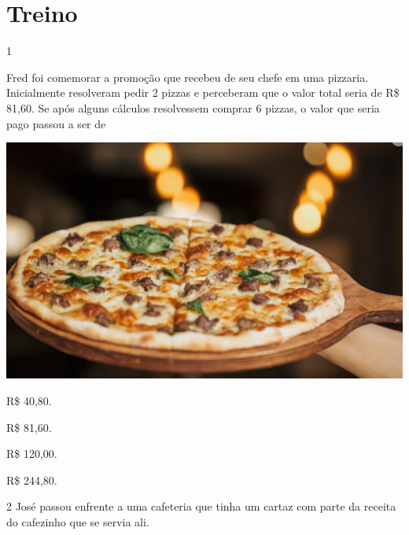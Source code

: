\pagebreak
\section*{Treino}

\num{1}

\begin{minipage}{.5\textwidth}
Fred foi comemorar a promoção que recebeu de seu chefe em uma
pizzaria. Inicialmente resolveram pedir 2 pizzas e perceberam que o
valor total seria de R\$ 81,60. Se após alguns cálculos resolvessem
comprar 6 pizzas, o valor que seria pago passou a ser de 
\end{minipage}\hspace{.5cm}
\begin{minipage}{.5\textwidth}
\includegraphics[width=\textwidth]{./imgs/mat15.png}
\end{minipage}

\begin{minipage}{.5\textwidth}
\begin{escolha}
\item
  R\$ 40,80.
\item
  R\$ 81,60.
\item
  R\$ 120,00.
\item
  R\$ 244,80.
\end{escolha}
\end{minipage}



\num{2} José passou enfrente a uma cafeteria que tinha um cartaz com parte
da receita do cafezinho que se servia ali.

